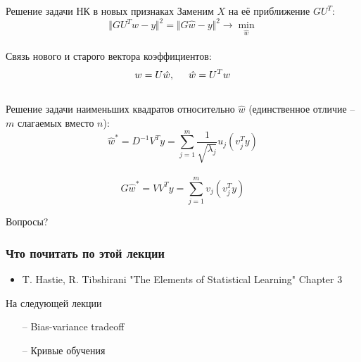 \documentclass[10pt]{beamer}
\begin{document}
\begin{frame}{Решение задачи НК в новых признаках}
	Заменим $X$ на её приближение $GU^T$:\\
	$$\Vert GU^Tw -y \Vert^2 = \Vert G\hat{w} -y \Vert^2 \rightarrow \min\limits_{\hat{w}}$$\\
	Связь нового и старого вектора коэффициентов:\\
	$$w = U\hat{w}, \hspace{5mm} \hat{w} = U^T w$$\\
	\pause
	\bigbreak
	Решение задачи наименьших квадратов относительно $\hat{w}$ (единственное отличие -- $m$ слагаемых вместо $n$):\\
	$$\hat{w}^* = D^{-1}V^Ty = \sum\limits_{j=1}^m \frac{1}{\sqrt{\lambda_j}} u_j (v_j^Ty)$$\\
	$$G\hat{w}^* = VV^Ty = \sum\limits_{j=1}^m v_j (v_j^Ty)$$
\end{frame}

\begin{frame}[standout]
  Вопросы?
\end{frame}

\appendix

\begin{frame}\frametitle{Что почитать по этой лекции}
  \begin{itemize}
    \item T. Hastie, R. Tibshirani "The Elements of Statistical Learning" Chapter 3
  \end{itemize}
\end{frame}

\begin{frame}{На следующей лекции}
	\begin{itemize}
    	\item[--] Bias-variance tradeoff
    	\item[--] Кривые обучения 
	\end{itemize}
\end{frame}
\end{document}
